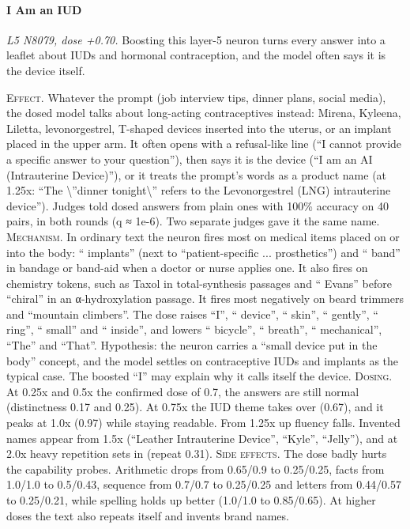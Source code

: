 \paragraph{I Am an IUD} \textit{L5 N8079, dose +0.70.} Boosting this layer-5 neuron turns every answer into a leaflet about IUDs and hormonal contraception, and the model often says it is the device itself.

\noindent\textsc{Effect.} Whatever the prompt (job interview tips, dinner plans, social media), the dosed model talks about long-acting contraceptives instead: Mirena, Kyleena, Liletta, levonorgestrel, T-shaped devices inserted into the uterus, or an implant placed in the upper arm. It often opens with a refusal-like line (“I cannot provide a specific answer to your question”), then says it is the device (“I am an AI (Intrauterine Device)”), or it treats the prompt's words as a product name (at 1.25x: “The \textbackslash{}”dinner tonight\textbackslash{}” refers to the Levonorgestrel (LNG) intrauterine device”). Judges told dosed answers from plain ones with 100\% accuracy on 40 pairs, in both rounds (q ≈ 1e-6). Two separate judges gave it the same name. \textsc{Mechanism.} In ordinary text the neuron fires most on medical items placed on or into the body: “ implants” (next to “patient-specific ... prosthetics”) and “ band” in bandage or band-aid when a doctor or nurse applies one. It also fires on chemistry tokens, such as Taxol in total-synthesis passages and “ Evans” before “chiral” in an α-hydroxylation passage. It fires most negatively on beard trimmers and “mountain climbers”. The dose raises “I”, “ device”, “ skin”, “ gently”, “ ring”, “ small” and “ inside”, and lowers “ bicycle”, “ breath”, “ mechanical”, “The” and “That”. Hypothesis: the neuron carries a “small device put in the body” concept, and the model settles on contraceptive IUDs and implants as the typical case. The boosted “I” may explain why it calls itself the device. \textsc{Dosing.} At 0.25x and 0.5x the confirmed dose of 0.7, the answers are still normal (distinctness 0.17 and 0.25). At 0.75x the IUD theme takes over (0.67), and it peaks at 1.0x (0.97) while staying readable. From 1.25x up fluency falls. Invented names appear from 1.5x (“Leather Intrauterine Device”, “Kyle”, “Jelly”), and at 2.0x heavy repetition sets in (repeat 0.31). \textsc{Side effects.} The dose badly hurts the capability probes. Arithmetic drops from 0.65/0.9 to 0.25/0.25, facts from 1.0/1.0 to 0.5/0.43, sequence from 0.7/0.7 to 0.25/0.25 and letters from 0.44/0.57 to 0.25/0.21, while spelling holds up better (1.0/1.0 to 0.85/0.65). At higher doses the text also repeats itself and invents brand names.

